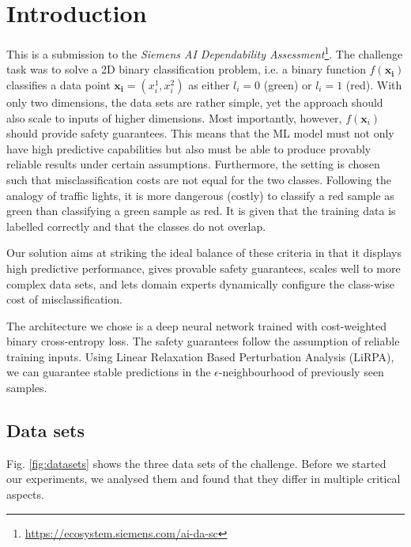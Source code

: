 \documentclass[acmsmall,nonacm]{acmart}
\begin{document}
\section{Introduction}

This is a submission to the \textit{Siemens AI Dependability Assessment}\footnote{\url{https://ecosystem.siemens.com/ai-da-sc}}. The challenge task was to solve a 2D binary classification problem, i.e. a binary function $f(\mathbf{x_i})$ classifies a data point $\mathbf{x_i} = (x_i^1, x_i^2)$ as either $l_i=0$ (green) or $l_i=1$ (red). With only two dimensions, the data sets are rather simple, yet the approach should also scale to inputs of higher dimensions. Most importantly, however, $f(\mathbf{x}_i)$ should provide safety guarantees. This means that the ML model must not only have high predictive capabilities but also must be able to produce provably reliable results under certain assumptions. Furthermore, the setting is chosen such that misclassification costs are not equal for the two classes. Following the analogy of traffic lights, it is more dangerous (costly) to classify a red sample as green than classifying a green sample as red. It is given that the training data is labelled correctly and that the classes do not overlap.  

Our solution aims at striking the ideal balance of these criteria in that it displays high predictive performance, gives provable safety guarantees, scales well to more complex data sets, and lets domain experts dynamically configure the class-wise cost of misclassification.

The architecture we chose is a deep neural network trained with cost-weighted binary cross-entropy loss. The safety guarantees follow the assumption of reliable training inputs. Using Linear Relaxation Based Perturbation Analysis (LiRPA), we can guarantee stable predictions in the $\epsilon$-neighbourhood of previously seen samples.

\subsection{Data sets}

Fig. \ref{fig:datasets} shows the three data sets of the challenge. Before we started our experiments, we analysed them and found that they differ in multiple critical aspects. 
\end{document}
